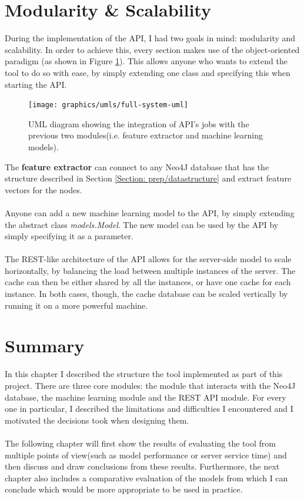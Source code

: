 	\section{Modularity \& Scalability} \label{Section: impl/modularity&scalability}
	During the implementation of the API, I had two goals in mind: modularity and scalability. In order to achieve this, every section makes use of the object-oriented paradigm (as shown in Figure \ref{Fig: impl/REST/API-integrate}). This allows anyone who wants to extend the tool to do so with ease, by simply extending one class and specifying this when starting the API.  
	\begin{figure}[H]
		\centering
		\texttt{[image: graphics/umls/full-system-uml]}
		\caption[General UML diagram]{\centering UML diagram showing the integration of API's jobs with the previous two modules(i.e. feature extractor and machine learning models).}
		\label{Fig: impl/REST/API-integrate}
	\end{figure}
	The \textbf{feature extractor} can connect to any Neo4J database that has the structure described in Section \ref{Section: prep/datastructure} and extract feature vectors for the nodes. 
	\\ \\
	Anyone can add a new machine learning model to the API, by simply extending the abstract class \textit{models.Model}. The new model can be used by the API by simply specifying it as a parameter.  
	\\ \\
	The REST-like architecture of the API allows for the server-side model to scale horizontally, by balancing the load between multiple instances of the server. The cache can then be either shared by all the instances, or have one cache for each instance. In both cases, though, the cache database can be scaled vertically by running it on a more powerful machine. 
	
	\section{Summary} \label{Section: impl/summary}
	In this chapter I described the structure the tool implemented as part of this project. There are three core modules: the module that interacts with the Neo4J database, the machine learning module and the REST API module. For every one in particular, I described the limitations and difficulties I encountered and I motivated the decisions took when designing them. 
	\\ \\
	The following chapter will first show the results of evaluating the tool from multiple points of view(such as model performance or server service time) and then discuss and draw conclusions from these results. Furthermore, the next chapter also includes a comparative evaluation of the models from which I can conclude which would be more appropriate to be used in practice. 
